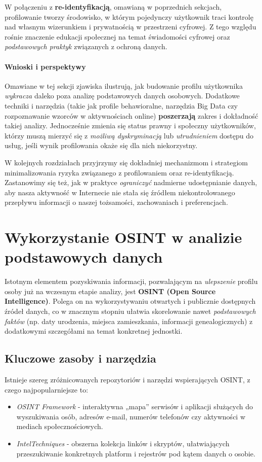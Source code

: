 \noindent W połączeniu z \textbf{re-identyfikacją}, omawianą w poprzednich sekcjach, profilowanie tworzy środowisko, w którym pojedynczy użytkownik traci kontrolę nad własnym wizerunkiem i prywatnością w przestrzeni cyfrowej. Z tego względu rośnie znaczenie edukacji społecznej na temat świadomości cyfrowej oraz \emph{podstawowych praktyk} związanych z ochroną danych.

\vspace{12pt}
\paragraph{Wnioski i perspektywy}
\noindent Omawiane w tej sekcji zjawiska ilustrują, jak budowanie profilu użytkownika \emph{wykracza} daleko poza analizę podstawowych danych osobowych. Dodatkowe techniki i narzędzia (takie jak profile behawioralne, narzędzia Big Data czy rozpoznawanie wzorców w aktywnościach online) \textbf{poszerzają} zakres i dokładność takiej analizy. Jednocześnie zmienia się status prawny i społeczny użytkowników, którzy muszą mierzyć się z \emph{możliwą dyskryminacją} lub \emph{utrudnieniem} dostępu do usług, jeśli wynik profilowania okaże się dla nich niekorzystny.

W kolejnych rozdziałach przyjrzymy się dokładniej mechanizmom i strategiom minimalizowania ryzyka związanego z profilowaniem oraz re-identyfikacją. Zastanowimy się też, jak w praktyce \emph{ograniczyć} nadmierne udostępnianie danych, aby nasza aktywność w Internecie nie stała się źródłem niekontrolowanego przepływu informacji o naszej tożsamości, zachowaniach i preferencjach.

\section{Wykorzystanie OSINT w analizie podstawowych danych}

\noindent
Istotnym elementem pozyskiwania informacji, pozwalającym na \emph{ulepszenie} profilu osoby już na wczesnym etapie analizy, jest \textbf{OSINT (Open Source Intelligence)}. Polega on na wykorzystywaniu otwartych i publicznie dostępnych źródeł danych, co w znacznym stopniu ułatwia skorelowanie nawet \emph{podstawowych faktów} (np. daty urodzenia, miejsca zamieszkania, informacji genealogicznych) z dodatkowymi szczegółami na temat konkretnej jednostki.

\subsection{Kluczowe zasoby i narzędzia}
Istnieje szereg zróżnicowanych repozytoriów i narzędzi wspierających OSINT, z czego najpopularniejsze to:
\begin{itemize}
    \item \emph{OSINT Framework}\cite{OSINT_FRAMEWORK} - interaktywna „mapa” serwisów i aplikacji służących do wyszukiwania osób, adresów e-mail, numerów telefonów czy aktywności w mediach społecznościowych.
    \item \emph{IntelTechniques}\cite{INTELTECHNIQUES} - obszerna kolekcja linków i skryptów, ułatwiających przeszukiwanie konkretnych platform i rejestrów pod kątem danych o osobie.
\end{itemize}

